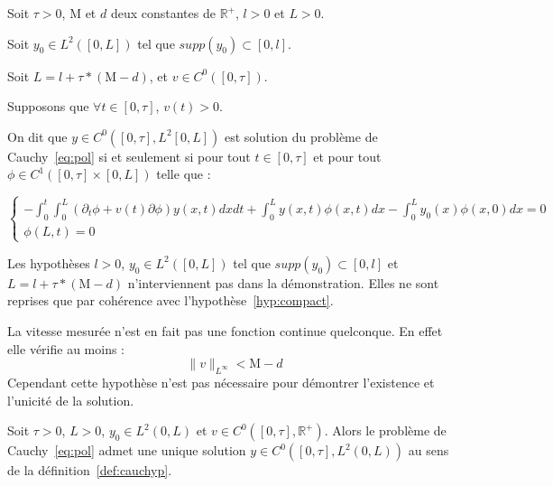 \documentclass[a4paper]{article}
\newcommand{\mass}{\mathrm{M}}
\newcommand{\dep}{d}
\begin{document}
\begin{definition}
	\label{def:cauchyp}
	Soit $\tau>0$, $\mass$ et $\dep$ deux constantes de $\mathbb{R}^+$, 
	$l>0$ et $L>0$. 
	
	Soit $y_0 \in L^2([0,L])$ tel que $supp(y_0) \subset [0,l]$.
	
	Soit $L=l+\tau*(\mass-\dep)$, et $v \in C^0([0,\tau])$.
	
	Supposons que $\forall t \in[0,\tau]$, $v(t)>0$.
	
	On dit que $y \in C^0([0,\tau],L^2[0,L])$ est solution du problème de Cauchy~\eqref{eq:pol}  
	si et seulement si pour tout $t \in [0,\tau]$ et pour
	tout $\phi \in C^1([0,\tau]\times [0,L])$ telle que :
	
	\begin{equation}
		\begin{cases}
			-\int_0^t \int_0^L (\partial_t \phi +v(t)\partial \phi) y(x,t) dxdt 
			+ \int_0^L y(x,t) \phi (x,t) dx - \int_0^L y_0(x)\phi(x,0)dx =0 \\
			\phi(L,t)=0
		\end{cases}
	\end{equation}
	
\end{definition}

\begin{remarque}
	Les hypothèses $l>0$, $y_0 \in L^2([0,L])$ tel que $supp(y_0) \subset [0,l]$ et $L=l+\tau*(\mass-\dep)$ n'interviennent pas dans la démonstration. 
	Elles ne sont reprises que par cohérence avec l'hypothèse~\eqref{hyp:compact}.
\end{remarque}

\begin{remarque}
	La vitesse mesurée n'est en fait pas une fonction continue quelconque.
	En effet elle vérifie au moins :
	\[\|v\|_{L^{\infty}} < \mass-\dep \]
	Cependant cette hypothèse n'est pas nécessaire pour démontrer l'existence et l'unicité de la solution.
\end{remarque}

\begin{theoreme}
	Soit $\tau >0$, $L>0$, $y_0 \in L^2(0,L)$ et $v \in C^0([0,\tau],\mathbb{R}^+)$.
	Alors le problème de Cauchy~\eqref{eq:pol} admet une unique solution $y \in C^0([0,\tau],L^2(0,L))$ au sens de la définition~\ref{def:cauchyp}.
\end{theoreme}
\end{document}
